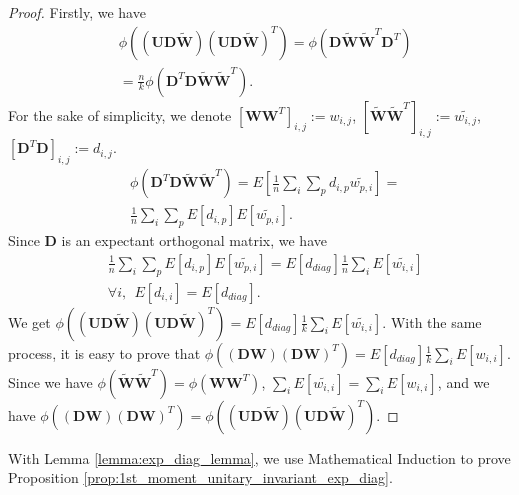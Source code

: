 \documentclass[10pt,journal,compsoc]{IEEEtran}
\begin{document}
\begin{proof}
Firstly, we have
\begin{equation}
\begin{split}
    & \phi\left(\left(\mathbf{UD}\widetilde{\mathbf{W}}\right)\left(\mathbf{UD}\widetilde{\mathbf{W}}\right)^T\right) = \phi\left(\mathbf{D}\widetilde{\mathbf{W}}\widetilde{\mathbf{W}}^T\mathbf{D}^T\right)\\
    &  = \frac{n}{k}\phi\left(\mathbf{D}^T\mathbf{D}\widetilde{\mathbf{W}}\widetilde{\mathbf{W}}^T\right).
\end{split}
\end{equation}
For the sake of simplicity, we denote $[\mathbf{WW}^T]_{i,j} := w_{i,j}$, $[\widetilde{\mathbf{W}}\widetilde{\mathbf{W}}^T]_{i,j} := \widetilde{w_{i,j}}$, $[\mathbf{D}^T\mathbf{D}]_{i,j} := d_{i,j}$. 
\begin{equation}
\begin{split}
    & \phi\left(\mathbf{D}^T\mathbf{D}\widetilde{\mathbf{W}}\widetilde{\mathbf{W}}^T\right) = E[\frac{1}{n}\sum_i\sum_pd_{i,p}\widetilde{w_{p,i}}] =\\
    & \frac{1}{n}\sum_i\sum_pE[d_{i,p}]E[\widetilde{w_{p,i}}].
\end{split}
\end{equation}
Since $\mathbf{D}$ is an expectant orthogonal matrix, we have
\begin{equation}
\begin{split}
    &  \frac{1}{n}\sum_i\sum_pE[d_{i,p}]E[\widetilde{w_{p,i}}] = E[d_{diag}]\frac{1}{n}\sum_iE[\widetilde{w_{i,i}}]\\
    & \forall i,~~E[d_{i,i}]=E[d_{diag}].
\end{split}
\label{equ:equ94}
\end{equation}
We get $\phi\left(\left(\mathbf{UD}\widetilde{\mathbf{W}}\right)\left(\mathbf{UD}\widetilde{\mathbf{W}}\right)^T\right) = E[d_{diag}]\frac{1}{k}\sum_iE[\widetilde{w_{i,i}}]$. With the same process, it is easy to prove that $\phi\left(\left(\mathbf{D}\mathbf{W}\right)\left(\mathbf{D}\mathbf{W}\right)^T\right) = E[d_{diag}]\frac{1}{k}\sum_iE[w_{i,i}]$. Since we have $\phi(\widetilde{\mathbf{W}}\widetilde{\mathbf{W}}^T) = \phi(\mathbf{WW}^T)$, $\sum_iE[\widetilde{w_{i,i}}]=\sum_iE[w_{i,i}]$, and we have $\phi\left(\left(\mathbf{DW}\right)\left(\mathbf{DW}\right)^T\right) = \phi\left(\left(\mathbf{UD}\widetilde{\mathbf{W}}\right)\left(\mathbf{UD}\widetilde{\mathbf{W}}\right)^T\right)$.
\end{proof}

With Lemma \ref{lemma:exp_diag_lemma}, we use Mathematical Induction to prove Proposition \ref{prop:1st_moment_unitary_invariant_exp_diag}.
\end{document}

